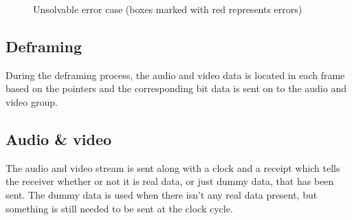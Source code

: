 \begin{figure}[h!]
  \centering
  \caption{Unsolvable error case (boxes marked with red represents errors)}
  \label{fig:error-case-2}
\end{figure}

\subsection{Deframing}
During the deframing process, the audio and video data is located in each frame based on the pointers and the corresponding bit data is sent on to the audio and video group.

\subsection{Audio \& video}
The audio and video stream is sent along with a clock and a receipt which tells the receiver whether or not it is real data, or just dummy data, that has been sent. The dummy data is used when there isn't any real data present, but something is still needed to be sent at the clock cycle.
